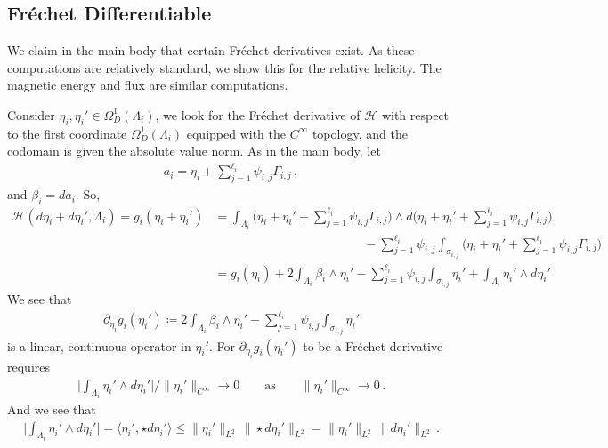 \documentclass[11pt]{article}
\theoremstyle{plain}
\theoremstyle{definition}
\theoremstyle{remark}
\newcommand{\ST}{\Lambda}
\begin{document}
\subsection{Fréchet Differentiable}\label{app:differentiable}


We claim in the main body that certain Fréchet derivatives exist. As these computations are relatively standard, we show this for the relative helicity. The magnetic energy and flux are similar computations.



Consider \( \eta_i , \eta_i' \in \Omega^1 _D(\ST_i)\), we look for the Fr\'echet derivative of \(\mathscr{H} \) with respect to the first coordinate \(\Omega^1 _D(\ST_i)\) equipped with the \(C^\infty\) topology, and the codomain is given the absolute value norm. As in the main body, let
\begin{align*}
    a_i =  \eta_i +  \sum_{j=1}^{{\ell_i}}  \psi_{i,j} \Gamma_{i,j} \, , 
\end{align*}
and \(\beta_i = da_i\). So,
\begin{align*}
    \mathscr{H}( d\eta_i + d\eta_i', \ST_i ) = g_i( \eta_i + \eta_i') &= \int_{\ST_i} \Big( \eta_i + \eta_i' + \sum_{j=1}^{{\ell_i}}  \psi_{i,j} \Gamma_{i,j}  \Big) \wedge d\Big( \eta_i + \eta_i' + \sum_{j=1}^{{\ell_i}}  \psi_{i,j} \Gamma_{i,j}  \Big) \\ & \hspace{12em} - \sum_{j=1}^{{\ell_i}} \psi_{i,j} \int_{\sigma_{i,j}} \Big( \eta_i + \eta_i' + \sum_{j=1}^{{\ell_i}}  \psi_{i,j} \Gamma_{i,j}  \Big) \\
    &= g_i( \eta_i ) +
    2 \int_{\ST_i} \beta_i \wedge  \eta_i'   - \sum_{j=1}^{{\ell_i}} \psi_{i,j} \int_{\sigma_{i,j}}  \eta_i' 
    +
    \int_{\ST_i}  \eta_i'  \wedge d \eta_i' 
\end{align*}
We see that 
\begin{align*}
    \partial_{\eta_i} g_i(  \eta_i'  ) \coloneqq 2 \int_{\ST_i} \beta_i \wedge  \eta_i'   - \sum_{j=1}^{{\ell_i}} \psi_{i,j} \int_{\sigma_{i,j}}  \eta_i' 
\end{align*}
is a linear, continuous operator in \(\eta_i'\). For \(\partial_{\eta_i} g_i(  \eta_i'  )\) to be a Fr\'echet derivative requires
\begin{align*}
    \Big| \int_{\ST_i}  \eta_i'  \wedge d \eta_i' \Big|  / \| \eta_i' \|_{C^\infty} \to 0 \qquad \text{as} \qquad  \| \eta_i' \|_{C^\infty} \to 0 \, . 
\end{align*}
And we see that
\begin{align*}
    \Big| \int_{\ST_i}  \eta_i'  \wedge d \eta_i' \Big| = \langle \eta_i'  , \star d \eta_i' \rangle
    \leq
    \| \eta_i' \|_{L^2} \, \| \star d \eta_i'  \|_{L^2}
    =
    \| \eta_i' \|_{L^2} \, \|  d \eta_i'  \|_{L^2} \, .
\end{align*}
\end{document}

